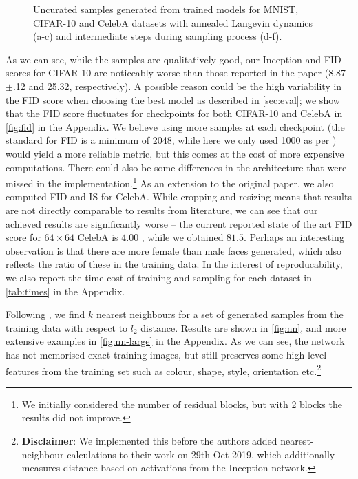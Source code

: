 \begin{figure}[h!]
     \caption{Uncurated samples generated from trained models for MNIST, CIFAR-10 and CelebA datasets with annealed Langevin dynamics (a-c) and intermediate steps during sampling process (d-f).}
     \label{fig:samples}
     \vspace{-3mm}
\end{figure}

As we can see, while the samples are qualitatively good, our Inception and FID scores for CIFAR-10 are noticeably worse than those reported in the paper (8.87$\pm$.12 and 25.32, respectively). A possible reason could be the high variability in the FID score when choosing the best model as described in \autoref{sec:eval}; we show that the FID score fluctuates for checkpoints for both CIFAR-10 and CelebA in \autoref{fig:fid} in the Appendix. We believe using more samples at each checkpoint (the standard for FID is a minimum of 2048, while here we only used 1000 as per \cite{ncsn-paper}) would yield a more reliable metric, but this comes at the cost of more expensive computations. There could also be some differences in the architecture that were missed in the implementation.\footnote{We initially considered the number of residual blocks, but with 2 blocks the results did not improve.} As an extension to the original paper, we also computed FID and IS for CelebA. While cropping and resizing means that results are not directly comparable to results from literature, we can see that our achieved results are significantly worse -- the current reported state of the art FID score for $64 \times 64$ CelebA is $4.00$ \cite{DBLP:journals/corr/abs-1904-00284}, while we obtained $81.5$. Perhaps an interesting observation is that there are more female than male faces generated, which also reflects the ratio of these in the training data. In the interest of reproducability, we also report the time cost of training and sampling for each dataset in \autoref{tab:times} in the Appendix.

Following \cite{ncsn-paper}, we find $k$ nearest neighbours for a set of generated samples from the training data with respect to $l_2$ distance. Results are shown in \autoref{fig:nn}, and more extensive examples in \autoref{fig:nn-large} in the Appendix. As we can see, the network has not memorised exact training images, but still preserves some high-level features from the training set such as colour, shape, style, orientation etc.\footnote{\textbf{Disclaimer}: We implemented this before the authors added nearest-neighbour calculations to their work on 29th Oct 2019, which additionally measures distance based on activations from the Inception network.}\vspace{-4mm}


